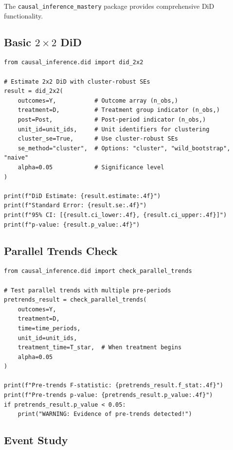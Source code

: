 The \texttt{causal\_inference\_mastery} package provides comprehensive DiD functionality.

\subsection{Basic $2 \times 2$ DiD}

\begin{verbatim}
from causal_inference.did import did_2x2

# Estimate 2x2 DiD with cluster-robust SEs
result = did_2x2(
    outcomes=Y,           # Outcome array (n_obs,)
    treatment=D,          # Treatment group indicator (n_obs,)
    post=Post,            # Post-period indicator (n_obs,)
    unit_id=unit_ids,     # Unit identifiers for clustering
    cluster_se=True,      # Use cluster-robust SEs
    se_method="cluster",  # Options: "cluster", "wild_bootstrap", "naive"
    alpha=0.05            # Significance level
)

print(f"DiD Estimate: {result.estimate:.4f}")
print(f"Standard Error: {result.se:.4f}")
print(f"95% CI: [{result.ci_lower:.4f}, {result.ci_upper:.4f}]")
print(f"p-value: {result.p_value:.4f}")
\end{verbatim}

\subsection{Parallel Trends Check}

\begin{verbatim}
from causal_inference.did import check_parallel_trends

# Test parallel trends with multiple pre-periods
pretrends_result = check_parallel_trends(
    outcomes=Y,
    treatment=D,
    time=time_periods,
    unit_id=unit_ids,
    treatment_time=T_star,  # When treatment begins
    alpha=0.05
)

print(f"Pre-trends F-statistic: {pretrends_result.f_stat:.4f}")
print(f"Pre-trends p-value: {pretrends_result.p_value:.4f}")
if pretrends_result.p_value < 0.05:
    print("WARNING: Evidence of pre-trends detected!")
\end{verbatim}

\subsection{Event Study}

